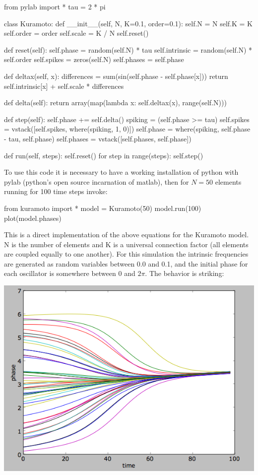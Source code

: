 \documentclass[12pt]{article}
\begin{document}
\begin{python}[]
from pylab import *
tau = 2 * pi

class Kuramoto:
    def __init__(self, N, K=0.1, order=0.1):
        self.N = N
        self.K = K
        self.order = order
        self.scale = K / N
        self.reset()

    def reset(self):
        self.phase = random(self.N) * tau
        self.intrinsic = random(self.N) * self.order
        self.spikes = zeros(self.N)
        self.phases = self.phase

    def deltax(self, x):
        differences = sum(sin(self.phase - self.phase[x]))
        return self.intrinsic[x] + self.scale * differences

    def delta(self):
        return array(map(lambda x: self.deltax(x), range(self.N)))

    def step(self):
        self.phase += self.delta()
        spiking = (self.phase >= tau)
        self.spikes = vstack([self.spikes, where(spiking, 1, 0)])
        self.phase = where(spiking, self.phase - tau, self.phase)
        self.phases = vstack([self.phases, self.phase])

    def run(self, steps):
        self.reset()
        for step in range(steps):
            self.step()
\end{python}

To use this code it is necessary to have a working installation of python with pylab (python's open source incarnation of matlab), then for $N=50$ elements running for 100 time steps invoke:

\begin{python}
from kuramoto import *
model = Kuramoto(50)
model.run(100)
plot(model.phases)
\end{python}

This is a direct implementation of the above equations for the Kuramoto model.  N is the number of elements and K is a universal connection factor (all elements are coupled equally to one another). For this simulation the intrinsic frequencies are generated as random variables between 0.0 and 0.1, and the initial phase for each oscillator is somewhere between $0$ and $2\pi$.  The behavior is striking:

\includegraphics[scale=0.67]{kuramoto.png}
\end{document}
